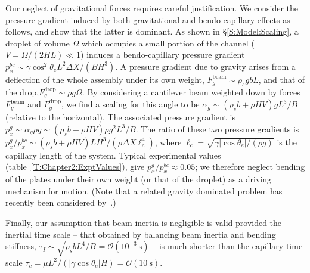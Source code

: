 Our neglect of gravitational forces requires careful justification.  We consider the pressure gradient induced by both gravitational and bendo-capillary effects as follows, and show that the latter is dominant. As shown in \S\ref{S:Model:Scaling}, a droplet of volume $\Omega$ which occupies a small portion of the channel ($V = \Omega /(2HL) \ll 1$) induces a bendo-capillary pressure gradient $p_x^{bc} \sim \gamma \cos^2 \theta_e L^2 \Delta X /(BH^3)$. A pressure gradient due to gravity arises from a deflection of the whole assembly under its own weight, $F_g^{\text{beam}} \sim \rho_s g b L$, and that of the drop,$F_g^{\text{drop}} \sim \rho g \Omega$. By considering a cantilever beam weighted down by forces $F_g^{\text{beam}}$ and $F_g^{\text{drop}}$, we find a scaling for this angle to be $\alpha_g \sim (\rho_s b + \rho H V)gL^3 /B$ (relative to the horizontal). The associated pressure gradient is $p_x^g \sim\alpha_g \rho g \sim (\rho_s b + \rho H V) \rho g^2 L^3 /B$. The ratio of these two pressure gradients is $p_x^g /p_x^{bc} \sim (\rho_s b + \rho H V)LH^3/(\rho \Delta X \ell_c^4)$, where $\ell_c = \sqrt{\gamma |\cos \theta_e|/(\rho g)} $ is the capillary length of the system. Typical experimental values (table~\ref{T:Chapter2:ExptValues}), give $p_x^g/p_x^{bc} \approx 0.05$; we therefore neglect bending of the plates under their own weight (or that of the droplet) as a driving mechanism for motion. (Note that a related gravity dominated problem has recently been considered by~\cite{Howell2016JFM}.)

Finally, our assumption that beam inertia is negligible is  valid provided the inertial time scale -- that obtained by balancing beam inertia and bending stiffness, $\tau_{I} \sim \sqrt{\rho_s b L^4 /B} = \mathcal{O}(10^{-3}~\text{s})$ -- is much shorter than the capillary time scale $\tau_c = \mu L^2 /( |\gamma \cos \theta_e|H) = \mathcal{O}(10~\text{s})$.\newline

